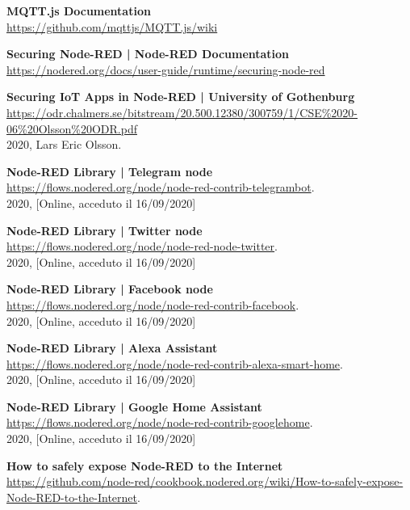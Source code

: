 \documentclass[a4paper,10pt]{memoir}
\begin{document}
\begin{thebibliography}{9}
    \textbf{MQTT.js Documentation}
    \\
    \href{https://github.com/mqttjs/MQTT.js/wiki}{https://github.com/mqttjs/MQTT.js/wiki}

    \textbf{Securing Node-RED | Node-RED Documentation}
    \\
    \href{https://nodered.org/docs/user-guide/runtime/securing-node-red}{https://nodered.org/docs/user-guide/runtime/securing-node-red}

    \textbf{Securing IoT Apps in Node-RED | University of Gothenburg}
    \\
    \href{https://odr.chalmers.se/bitstream/20.500.12380/300759/1/CSE\%2020-06\%20Olsson\%20ODR.pdf}{https://odr.chalmers.se/bitstream/20.500.12380/300759/1/CSE\%2020-06\%20Olsson\%20ODR.pdf}
    \\
    2020, Lars Eric Olsson.
    
    \textbf{Node-RED Library | Telegram node}
    \\
    \href{https://flows.nodered.org/node/node-red-contrib-telegrambot}{https://flows.nodered.org/node/node-red-contrib-telegrambot}.
    \\
    2020, [Online, acceduto il 16/09/2020]
    
    \textbf{Node-RED Library | Twitter node}
    \\
    \href{https://flows.nodered.org/node/node-red-node-twitter}{https://flows.nodered.org/node/node-red-node-twitter}.
    \\
    2020, [Online, acceduto il 16/09/2020]
    
    \textbf{Node-RED Library | Facebook node}
    \\
    \href{https://flows.nodered.org/node/node-red-contrib-facebook}{https://flows.nodered.org/node/node-red-contrib-facebook}.
    \\
    2020, [Online, acceduto il 16/09/2020]

    \textbf{Node-RED Library | Alexa Assistant}
    \\
    \href{https://flows.nodered.org/node/node-red-contrib-alexa-smart-home}{https://flows.nodered.org/node/node-red-contrib-alexa-smart-home}.
    \\
    2020, [Online, acceduto il 16/09/2020]

    \textbf{Node-RED Library | Google Home Assistant}
    \\
    \href{https://flows.nodered.org/node/node-red-contrib-googlehome}{https://flows.nodered.org/node/node-red-contrib-googlehome}.
    \\
    2020, [Online, acceduto il 16/09/2020]

    \textbf{How to safely expose Node-RED to the Internet}
    \\
    \href{https://github.com/node-red/cookbook.nodered.org/wiki/How-to-safely-expose-Node-RED-to-the-Internet}{https://github.com/node-red/cookbook.nodered.org/wiki/How-to-safely-expose-Node-RED-to-the-Internet}.

\end{thebibliography}
\end{document}

